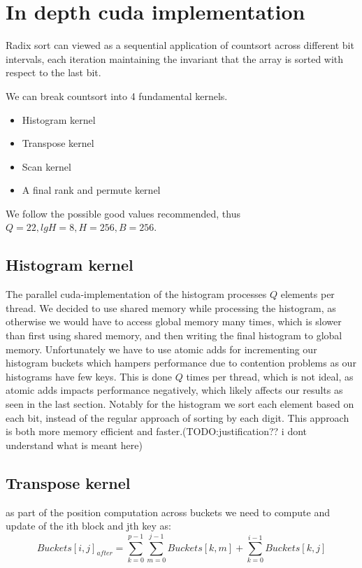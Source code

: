 \documentclass{article}
\begin{document}
\section{In depth cuda implementation}

Radix sort can viewed as a sequential application of countsort across different bit intervals, each iteration maintaining the invariant that
the array is sorted with respect to the last bit.

We can break countsort into 4 fundamental kernels.

\begin{itemize}
    \item Histogram kernel
    \item Transpose kernel
    \item Scan kernel
    \item A final rank and permute kernel
\end{itemize}

We follow the possible good values recommended, thus $Q = 22, lgH = 8, H = 256, B = 256$.

\subsection{Histogram kernel}
The parallel cuda-implementation of the histogram processes $Q$ elements per thread. 
We decided to use shared memory while processing the histogram, as otherwise we would have to access global memory many times, which is slower than first using shared memory, and then writing the final histogram to global memory.
Unfortunately we have to use atomic adds for incrementing our histogram buckets which hampers performance due to contention problems as our histograms have few keys. This is done $Q$ times per thread, which is not ideal, as atomic adds impacts performance negatively, which likely affects our results as seen in the last section.
Notably for the histogram we sort each element based on each bit, instead of the regular approach of sorting by each digit. This approach is both more memory efficient and faster.(TODO:justification?? i dont understand what is meant here)

\subsection{Transpose kernel}

as part of the position computation across buckets we need to compute and update of the ith block and jth key as:
\[
Buckets[i,j]_{after} = \sum_{k=0}^{p-1} \sum_{m=0}^{j-1} Buckets[k,m] + \sum_{k=0}^{i-1} Buckets[k,j]
\]
\end{document}
